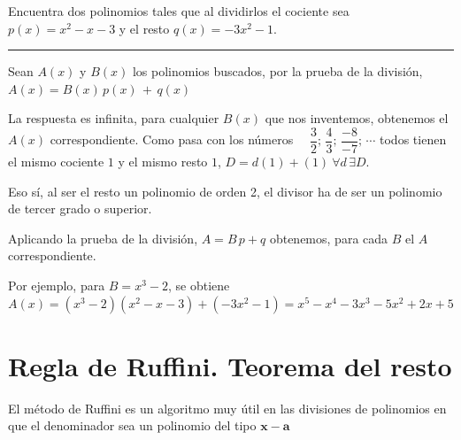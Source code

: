 \begin{miejercicio}

Encuentra dos polinomios tales que al dividirlos el cociente sea $p(x)=x^2-x-3$ y el resto $q(x)=-3x^2-1$.

\vspace{-2mm}
\rule{250pt}{0.1pt}	

Sean $A(x)$ y $B(x)$ los polinomios buscados, por la prueba de la división, $A(x)=B(x)\, p(x) \, + \, q(x)$

\vspace{2mm} La respuesta es infinita, para cualquier $B(x)$ que nos inventemos, obtenemos el $A(x)$ correspondiente. Como pasa con los números \textcolor{gris}{$\quad  \dfrac 3 2 ; \, \dfrac {4}{3}; \,  \dfrac{-8}{-7} ; \, \cdots $ todos tienen el mismo cociente $1$ y el mismo resto $1$, $D=d(1)+(1) \ \forall d \, \exists D$}.

\vspace{2mm} Eso sí, al ser el resto un polinomio de orden 2, el divisor ha de ser un polinomio de tercer grado o superior.

\vspace{2mm} Aplicando la prueba de la división, $A=B\, p+q$ obtenemos, para cada $B$ el $A$ correspondiente.

\vspace{2mm} Por ejemplo, para $B=x^3-2$, se obtiene $A(x)=(x^3-2)(x^2-x-3)+(-3x^2-1)=x^5-x^4-3x^3-5x^2+2x+5$
\end{miejercicio}




\section{Regla de Ruffini. Teorema del resto}
\vspace{0.5cm}

El método de Ruffini es un algoritmo muy útil en las divisiones de polinomios en que el denominador sea un polinomio del tipo $\boldsymbol{x-a}$

